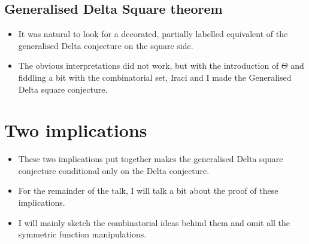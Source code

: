 \documentclass[12pt]{article}
\begin{document}
\subsection{Generalised Delta Square theorem}
\begin{itemize}
    \item It was natural to look for a decorated, partially labelled equivalent of the generalised Delta conjecture on the square side. 
    \item The obvious interpretations did not work, but with the introduction of $\Theta$ and fiddling a bit with the combinatorial set, Iraci and I made the Generalised Delta square conjecture. 
\end{itemize}

\section{Two implications}
    \begin{itemize}
        \item These two implications put together makes the generalised Delta square conjecture conditional only on the Delta conjecture.
        \item For the remainder of the talk, I will talk a bit about the proof of these implications.
        \item I will mainly sketch the combinatorial ideas behind them and omit all the symmetric function manipulations.
    \end{itemize}
\end{document}
